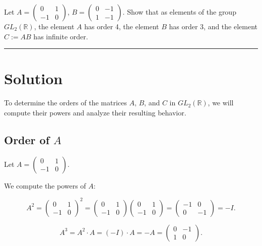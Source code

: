 \documentclass[12pt]{amsart}
\theoremstyle{definition}
\numberwithin{equation}{section}
\newcommand{\R}{\mathbb{R}}
\begin{document}
\begin{exercise}{5} 
    Let \(A = \begin{pmatrix} 0 & 1 \\ -1 & 0 \end{pmatrix}\), \(B= \begin{pmatrix} 0 & -1 \\ 1 & -1 \end{pmatrix}\). Show that as elements of the group \(GL_2(\R)\), the element \(A\) has order 4, the element \(B\) has order 3, and the element \(C := AB\) has infinite order.
    
    \noindent\rule{\linewidth}{1pt}
    
    \section*{Solution}
    
    To determine the orders of the matrices \(A\), \(B\), and \(C\) in \(GL_2(\R)\), we will compute their powers and analyze their resulting behavior.
    
    \subsection*{Order of \(A\)}
    
    Let \(A = \begin{pmatrix} 0 & 1 \\ -1 & 0 \end{pmatrix}\).
    
    We compute the powers of \(A\):
    
    \[
    A^2 = \begin{pmatrix} 0 & 1 \\ -1 & 0 \end{pmatrix}^2 = \begin{pmatrix} 0 & 1 \\ -1 & 0 \end{pmatrix} \begin{pmatrix} 0 & 1 \\ -1 & 0 \end{pmatrix} = \begin{pmatrix} -1 & 0 \\ 0 & -1 \end{pmatrix} = -I.
    \]
    
    \[
    A^3 = A^2 \cdot A = (-I) \cdot A = -A = \begin{pmatrix} 0 & -1 \\ 1 & 0 \end{pmatrix}.
    \]
    

\end{exercise}
\end{document}
